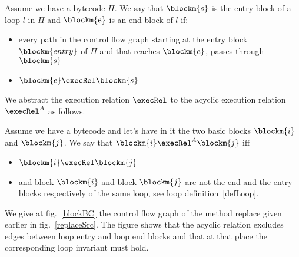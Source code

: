 
\begin{defn}
\label{defLoop}
Assume we have a bytecode $\Pi$. We say that $\blockm{s}$ is the entry block of a loop $l$ in $\Pi$ and $\blockm{e}$ is an end block of $l$ if:
\begin{itemize}
\item every path in the control flow graph starting at the entry block $\blockm{entry}$ of $\Pi$ and that reaches $\blockm{e}$, passes through  $\blockm{s}$ 
\item $\blockm{e} \execRel \blockm{s}$
\end{itemize}
\end{defn}
We abstract the execution relation $\execRel$ to the acyclic execution relation $\execRel^A$ as follows. 

\begin{defn}
\label{acyclicExRel}
Assume we have a bytecode and let's have in it the two basic blocks  $\blockm{i} $ and   $\blockm{j}$. We say 
that $\blockm{i} \execRel^A \blockm{j}$ iff
\begin{itemize}
\item $\blockm{i} \execRel \blockm{j}$
\item and block $\blockm{i}$ and block $\blockm{j}$ are not the end and the entry blocks respectively of the same loop, see loop definition~\ref{defLoop}.
\end{itemize}
\end{defn}

We give at fig.~\ref{blockBC} the control flow graph of the method replace given earlier in fig.~\ref{replaceSrc}. The figure shows that the acyclic relation
excludes edges between loop entry and loop end blocks and that at that place the corresponding loop invariant must hold.  

